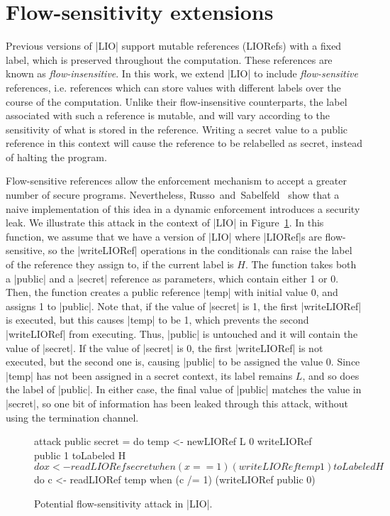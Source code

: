 \section{Flow-sensitivity extensions}
\label{sec:flow-sensitive}

Previous versions of |LIO| support mutable references (LIORefs) with a
fixed label, which is preserved throughout the computation. These
references are known as \emph{flow-insensitive}. In this work, we
extend |LIO| to include \emph{flow-sensitive} references,
i.e. references which can store values with different labels over the
course of the computation. Unlike their flow-insensitive counterparts,
the label associated with such a reference is mutable, and will vary
according to the sensitivity of what is stored in the
reference. Writing a secret value to a public reference in this
context will cause the reference to be relabelled as secret, instead
of halting the program.

Flow-sensitive references allow the enforcement mechanism to accept a
greater number of secure programs. Nevertheless,
Russo~and~Sabelfeld~\citep{?} show that a naive implementation of this
idea in a dynamic enforcement introduces a security leak. We
illustrate this attack in the context of |LIO| in
Figure~\ref{fig:fs-attack}. In this function, we assume that we have a
version of |LIO| where |LIORef|s are flow-sensitive, so the
|writeLIORef| operations in the conditionals can raise the label of
the reference they assign to, if the current label is $H$. The
function takes both a |public| and a |secret| reference as parameters,
which contain either 1 or 0. Then, the function creates a public
reference |temp| with initial value 0, and assigns 1 to |public|.
Note that, if the value of |secret| is 1, the first |writeLIORef| is
executed, but this causes |temp| to be 1, which prevents the second
|writeLIORef| from executing. Thus, |public| is untouched and it will
contain the value of |secret|. If the value of |secret| is 0, the
first |writeLIORef| is not executed, but the second one is, causing
|public| to be assigned the value 0. Since |temp| has not been
assigned in a secret context, its label remains $L$, and so does the
label of |public|. In either case, the final value of |public| matches
the value in |secret|, so one bit of information has been leaked
through this attack, without using the termination channel.

\begin{figure}[!ht]
\vspace*{-5pt}
\begin{code}
attack public secret = 
  do  temp    <- newLIORef L 0
      writeLIORef public 1
      toLabeled H $ do
        x <- readLIORef secret
        when (x == 1) (writeLIORef temp 1)
      toLabeled H $ do
        c <- readLIORef temp
        when (c /= 1) (writeLIORef public 0)
\end{code}
\caption{Potential flow-sensitivity attack in |LIO|.\label{fig:fs-attack}}
\vspace*{-5pt}
\end{figure}

